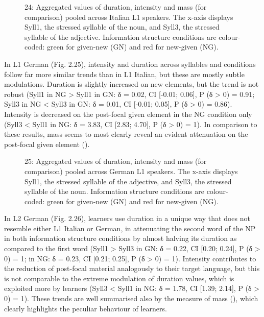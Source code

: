   
 

\begin{stylecaption}\begin{figure}
\caption{24: Aggregated values of duration, intensity and mass (for comparison) pooled across Italian L1 speakers. The x-axis displays Syll1, the stressed syllable of the noun, and Syll3, the stressed syllable of the adjective. Information structure conditions are colour-coded: green for given-new (GN) and red for new-given (NG).}
\label{fig:key:2}
\end{figure}\end{stylecaption}

In L1 German (Fig. 2.25), intensity and duration across syllables and conditions follow far more similar trends than in L1 Italian, but these are mostly subtle modulations. Duration is slightly increased on new elements, but the trend is not robust (Syll1 in NG > Syll1 in GN: δ = 0.02, CI [-0.01; 0.06], P (δ > 0) = 0.91; Syll3 in NG < Syll3 in GN: δ = 0.01, CI [-0.01; 0.05], P (δ > 0) = 0.86). Intensity is decreased on the post-focal given element in the NG condition only (Syll3 < Syll1 in NG: δ = 3.83, CI [2.83; 4.70], P (δ > 0) = 1). In comparison to these results, mass seems to most clearly reveal an evident attenuation on the post-focal given element ().

  
 

\begin{stylecaption}\begin{figure}
\caption{25: Aggregated values of duration, intensity and mass (for comparison) pooled across German L1 speakers. The x-axis displays Syll1, the stressed syllable of the adjective, and Syll3, the stressed syllable of the noun. Information structure conditions are colour-coded: green for given-new (GN) and red for new-given (NG).}
\label{fig:key:2}
\end{figure}\end{stylecaption}

In L2 German (Fig. 2.26), learners use duration in a unique way that does not resemble either L1 Italian or German, in attenuating the second word of the NP in both information structure conditions by almost halving its duration as compared to the first word (Syll1 > Syll3 in GN: δ = 0.22, CI [0.20; 0.24], P (δ > 0) = 1; in NG: δ = 0.23, CI [0.21; 0.25], P (δ > 0) = 1). Intensity contributes to the reduction of post-focal material analogously to their target language, but this is not comparable to the extreme modulation of duration values, which is exploited more by learners (Syll3 < Syll1 in NG: δ = 1.78, CI [1.39; 2.14], P (δ > 0) = 1). These trends are well summarised also by the measure of mass (), which clearly highlights the peculiar behaviour of learners.

